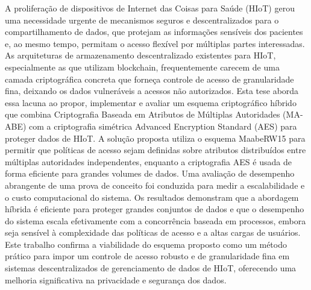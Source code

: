 \documentclass[cic,tc,english]{iiufrgs}
\numberwithin{algorithm}{chapter}
\begin{document}
\begin{translatedabstract}
    A proliferação de dispositivos de Internet das Coisas para Saúde (HIoT) gerou uma necessidade urgente de mecanismos seguros e descentralizados para o compartilhamento de dados, que protejam as informações sensíveis dos pacientes e, ao mesmo tempo, permitam o acesso flexível por múltiplas partes interessadas. As arquiteturas de armazenamento descentralizado existentes para HIoT, especialmente as que utilizam blockchain, frequentemente carecem de uma camada criptográfica concreta que forneça controle de acesso de granularidade fina, deixando os dados vulneráveis a acessos não autorizados. Esta tese aborda essa lacuna ao propor, implementar e avaliar um esquema criptográfico híbrido que combina Criptografia Baseada em Atributos de Múltiplas Autoridades (MA-ABE) com a criptografia simétrica Advanced Encryption Standard (AES) para proteger dados de HIoT. A solução proposta utiliza o esquema MaabeRW15 para permitir que políticas de acesso sejam definidas sobre atributos distribuídos entre múltiplas autoridades independentes, enquanto a criptografia AES é usada de forma eficiente para grandes volumes de dados. Uma avaliação de desempenho abrangente de uma prova de conceito foi conduzida para medir a escalabilidade e o custo computacional do sistema. Os resultados demonstram que a abordagem híbrida é eficiente para proteger grandes conjuntos de dados e que o desempenho do sistema escala efetivamente com a concorrência baseada em processos, embora seja sensível à complexidade das políticas de acesso e a altas cargas de usuários. Este trabalho confirma a viabilidade do esquema proposto como um método prático para impor um controle de acesso robusto e de granularidade fina em sistemas descentralizados de gerenciamento de dados de HIoT, oferecendo uma melhoria significativa na privacidade e segurança dos dados.
\end{translatedabstract}

\listoffigures

\listoftables

\listofalgorithms
\end{document}
